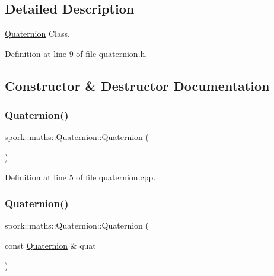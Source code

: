 \subsection{Detailed Description}
\hyperlink{structspork_1_1maths_1_1_quaternion}{Quaternion} Class. 

Definition at line 9 of file quaternion.\+h.



\subsection{Constructor \& Destructor Documentation}
\mbox{\label{structspork_1_1maths_1_1_quaternion_a4833d11706aa52389dd084604598ff57}} 
\subsubsection{\texorpdfstring{Quaternion()}{Quaternion()}\hspace{0.1cm}{\footnotesize\ttfamily [1/6]}}
{\footnotesize\ttfamily spork\+::maths\+::\+Quaternion\+::\+Quaternion (\begin{DoxyParamCaption}{ }\end{DoxyParamCaption})}



Definition at line 5 of file quaternion.\+cpp.

\mbox{\label{structspork_1_1maths_1_1_quaternion_a00c329e5b67a4a7bf2a9b5c0f5baf419}} 
\subsubsection{\texorpdfstring{Quaternion()}{Quaternion()}\hspace{0.1cm}{\footnotesize\ttfamily [2/6]}}
{\footnotesize\ttfamily spork\+::maths\+::\+Quaternion\+::\+Quaternion (\begin{DoxyParamCaption}\item[{const \hyperlink{structspork_1_1maths_1_1_quaternion}{Quaternion} \&}]{quat }\end{DoxyParamCaption})}



